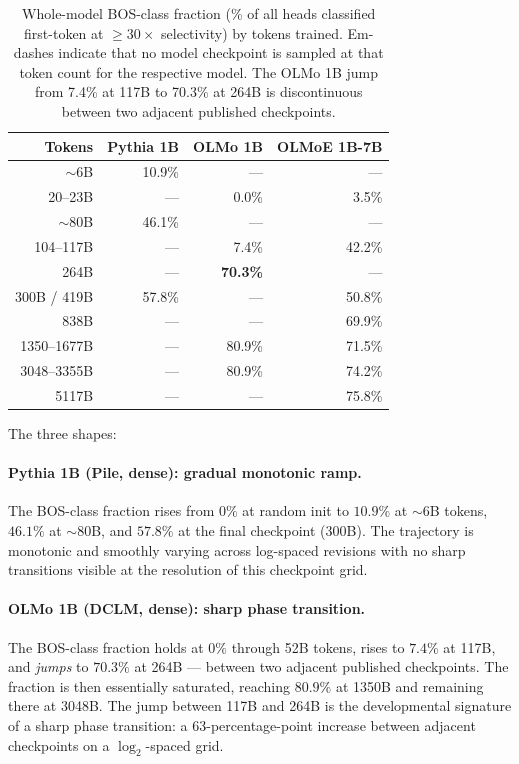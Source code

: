 \documentclass[11pt]{article}
\begin{document}
\begin{table}[t]
\centering
\caption{Whole-model BOS-class fraction (\% of all heads classified
first-token at $\ge 30\times$ selectivity) by tokens trained.
Em-dashes indicate that no model checkpoint is sampled at that
token count for the respective model. The OLMo 1B jump from 7.4\% at 117B
to 70.3\% at 264B is discontinuous between two adjacent published
checkpoints.}
\label{tab:bos_shapes}
\small
\begin{tabular}{r r r r}
\toprule
Tokens & Pythia 1B & OLMo 1B & OLMoE 1B-7B \\
\midrule
$\sim$6B           & 10.9\% & ---           & ---     \\
20--23B            & ---    & 0.0\%         & 3.5\%   \\
$\sim$80B          & 46.1\% & ---           & ---     \\
104--117B          & ---    & 7.4\%         & 42.2\%  \\
264B               & ---    & \textbf{70.3\%} & ---   \\
300B / 419B        & 57.8\% & ---           & 50.8\%  \\
838B               & ---    & ---           & 69.9\%  \\
1350--1677B        & ---    & 80.9\%        & 71.5\%  \\
3048--3355B        & ---    & 80.9\%        & 74.2\%  \\
5117B              & ---    & ---           & 75.8\%  \\
\bottomrule
\end{tabular}
\end{table}

The three shapes:

\paragraph{Pythia 1B (Pile, dense): gradual monotonic ramp.} The BOS-class
fraction rises from $0\%$ at random init to $10.9\%$ at $\sim$6B tokens,
$46.1\%$ at $\sim$80B, and $57.8\%$ at the final checkpoint (300B). The
trajectory is monotonic and smoothly varying across log-spaced revisions
with no sharp transitions visible at the resolution of this checkpoint
grid.

\paragraph{OLMo 1B (DCLM, dense): sharp phase transition.} The BOS-class
fraction holds at $0\%$ through 52B tokens, rises to $7.4\%$ at 117B, and
\emph{jumps} to $70.3\%$ at 264B --- between two adjacent published
checkpoints. The fraction is then essentially saturated, reaching $80.9\%$
at 1350B and remaining there at 3048B. The jump between 117B and 264B is
the developmental signature of a sharp phase transition: a 63-percentage-point
increase between adjacent checkpoints on a $\log_2$-spaced grid.
\end{document}
